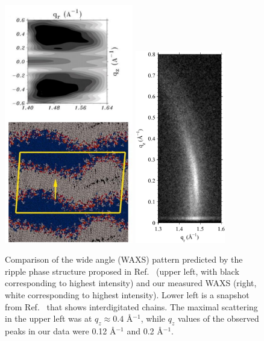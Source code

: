 \begin{figure}[htbp]
  \centering
  \includegraphics[width=0.5\textwidth]{figures/ripple/discussion/deVries_waxs}
  \qquad
  \includegraphics[width=0.35\textwidth]{figures/ripple/discussion/ripple_waxs}
  \caption{Comparison of the wide angle (WAXS) pattern predicted by the 
  ripple phase structure proposed in Ref.~\cite{ref:deVries05} 
(upper left, with black corresponding to highest intensity) and
  our measured WAXS (right, white corresponding to highest intensity). 
Lower left is a snapshot from Ref.~\cite{ref:deVries05} that shows interdigitated chains.  The maximal scattering in the upper left  was at $q_z \approx 0.4$ \AA$^{-1}$,
  while $q_z$ values of the observed peaks in our data were 0.12 \AA$^{-1}$
  and 0.2 \AA$^{-1}$.}
  \label{fig:nGIWAXS_comparison}
\end{figure}

